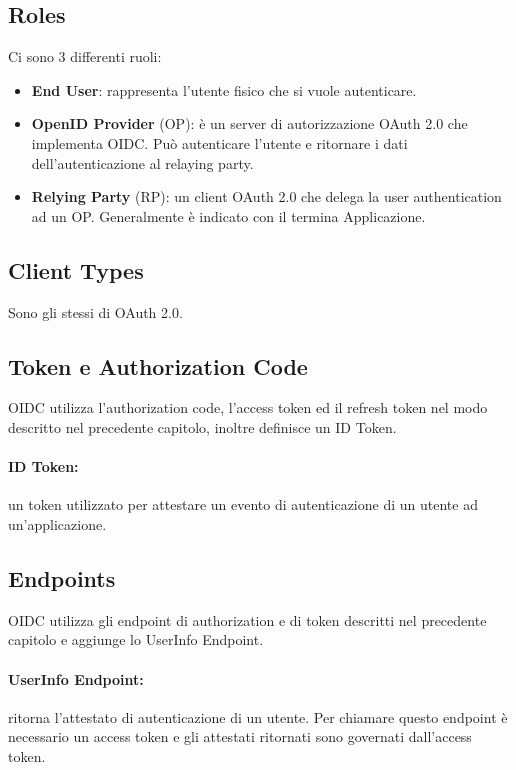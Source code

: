 \subsection{Roles}

Ci sono 3 differenti ruoli:

\begin{itemize}
      \item \textbf{End User}: rappresenta l'utente fisico che si vuole autenticare.
      \item \textbf{OpenID Provider} (OP): è un server di autorizzazione OAuth 2.0 che
            implementa OIDC. Può autenticare l'utente e ritornare i dati dell'autenticazione
            al relaying party.
      \item \textbf{Relying Party} (RP): un client OAuth 2.0 che delega la user
            authentication
            ad un OP. Generalmente è indicato con il termina Applicazione.
\end{itemize}

\subsection{Client Types}

Sono gli stessi di OAuth 2.0.

\subsection{Token e Authorization Code}

OIDC utilizza l'authorization code, l'access token ed il refresh token nel modo descritto
nel precedente capitolo, inoltre definisce un ID Token.

\paragraph{ID Token:} un token utilizzato per attestare un evento di autenticazione
di un utente ad un'applicazione.

\subsection{Endpoints}

OIDC utilizza gli endpoint di authorization e di token descritti nel precedente capitolo
e aggiunge lo UserInfo Endpoint.

\paragraph{UserInfo Endpoint:} ritorna l'attestato di autenticazione di un utente.
Per chiamare questo endpoint è necessario un access token e gli attestati ritornati
sono governati dall'access token.

